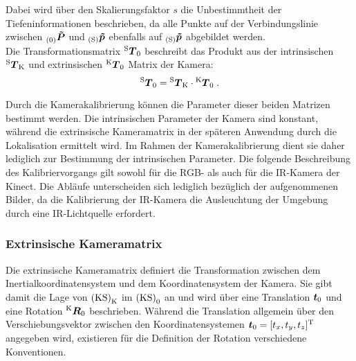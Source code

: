 
Dabei wird über den Skalierungsfaktor $s$ die Unbestimmtheit der Tiefeninformationen beschrieben, da alle Punkte auf der Verbindungslinie zwischen ${_{{\mathrm{(0)}}}}\mbox{\boldmath{$\tilde{P}$}}$ und ${_{{\mathrm{(S)}}}}\mbox{\boldmath{$\tilde{p}$}}$ ebenfalls auf ${_{{\mathrm{(S)}}}}\mbox{\boldmath{$\tilde{p}$}}$ abgebildet werden.\\ 
\prever{
}
Die Transformationsmatrix ${^{\mathrm{S}}\mbox{\boldmath{$T$}}_{\mathrm{0}}}$ beschreibt das Produkt aus der intrinsischen ${^{\mathrm{S}}\mbox{\boldmath{$T$}}_{\mathrm{K}}}$ und extrinsischen ${^{\mathrm{K}}\mbox{\boldmath{$T$}}_{\mathrm{0}}}$ Matrix der Kamera:
%
\begin{equation}
{^{\mathrm{S}}\mbox{\boldmath{$T$}}_{\mathrm{0}}} = {^{\mathrm{S}}\mbox{\boldmath{$T$}}_{\mathrm{K}}} \cdot {^{\mathrm{K}}\mbox{\boldmath{$T$}}_{\mathrm{0}}} \; \text{.}
\end{equation}

Durch die Kamerakalibrierung können die Parameter dieser beiden Matrizen bestimmt werden. Die intrinsischen Parameter der Kamera sind konstant, während die extrinsische Kameramatrix in der späteren Anwendung durch die Lokalisation ermittelt wird. Im Rahmen der Kamerakalibrierung dient sie daher lediglich zur Bestimmung der intrinsischen Parameter. Die folgende Beschreibung des Kalibriervorgangs gilt sowohl für die RGB- als auch für die IR-Kamera der Kinect. Die Abläufe unterscheiden sich lediglich bezüglich der aufgenommenen Bilder, da die Kalibrierung der IR-Kamera die Ausleuchtung der Umgebung durch eine IR-Lichtquelle erfordert.

\subsubsection{Extrinsische Kameramatrix}
\label{chap.perspproj}
\prever{
}
Die extrinsische Kameramatrix definiert die Transformation zwischen dem Inertialkoordinatensystem und dem Koordinatensystem der Kamera. Sie gibt damit die Lage von ${\mathrm{(KS)}}_{\mathrm{K}}$ im ${\mathrm{(KS)}}_{\mathrm{0}}$ an und wird über eine Translation $\mbox{\boldmath{$t$}}_{\mathrm{0}}$ und eine Rotation ${^{\mathrm{K}}\mbox{\boldmath{$R$}}_{\mathrm{0}}}$ beschrieben. Während die Translation allgemein über den Verschiebungsvektor zwischen den Koordinatensystemen $\mbox{\boldmath{$t$}}_{\mathrm{0}} = [t_x, t_y, t_z]^{\mathrm{T}}$ angegeben wird, existieren für die Definition der Rotation verschiedene Konventionen.\\


